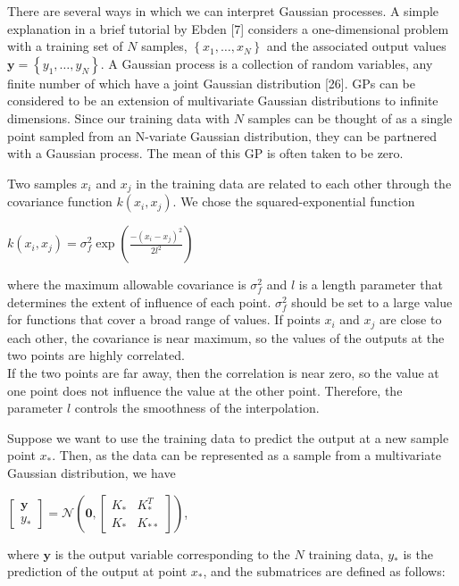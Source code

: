 \documentclass[10pt]{article}
\begin{document}
There are several ways in which we can interpret Gaussian processes. A simple explanation in a brief tutorial by Ebden [7] considers a one-dimensional problem with a training set of $N$ samples, $\left\{x_{1}, \ldots, x_{N}\right\}$ and the associated output values $\mathbf{y}=\left\{y_{1}, \ldots, y_{N}\right\}$. A Gaussian process is a collection of random variables, any finite number of which have a joint Gaussian distribution [26]. GPs can be considered to be an extension of multivariate Gaussian distributions to infinite dimensions. Since our training data with $N$ samples can be thought of as a single point sampled from an $\mathrm{N}$-variate Gaussian distribution, they can be partnered with a Gaussian process. The mean of this GP is often taken to be zero.

Two samples $x_{i}$ and $x_{j}$ in the training data are related to each other through the covariance function $k\left(x_{i}, x_{j}\right)$. We chose the squared-exponential function

$k\left(x_{i}, x_{j}\right)=\sigma_{f}^{2} \exp \left(\frac{-\left(x_{i}-x_{j}\right)^{2}}{2 l^{2}}\right)$

where the maximum allowable covariance is $\sigma_{f}^{2}$ and $l$ is a length parameter that determines the extent of influence of each point. $\sigma_{f}^{2}$ should be set to a large value for functions that cover a broad range of values. If points $x_{i}$ and $x_{j}$ are close to each other, the covariance is near maximum, so the values of the outputs at the two points are highly correlated.\\
If the two points are far away, then the correlation is near zero, so the value at one point does not influence the value at the other point. Therefore, the parameter $l$ controls the smoothness of the interpolation.

Suppose we want to use the training data to predict the output at a new sample point $x_{*}$. Then, as the data can be represented as a sample from a multivariate Gaussian distribution, we have

$\left[\begin{array}{c}\mathbf{y} \\ y_{*}\end{array}\right]=\mathcal{N}\left(\mathbf{0},\left[\begin{array}{ll}K_{*} & K_{*}^{T} \\ K_{*} & K_{* *}\end{array}\right]\right)$,

where $\mathbf{y}$ is the output variable corresponding to the $N$ training data, $y_{*}$ is the prediction of the output at point $x_{*}$, and the submatrices are defined as follows:
\end{document}
